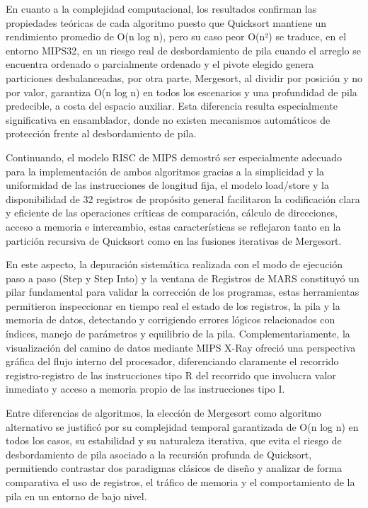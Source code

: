 \documentclass[12pt, letterpaper]{article}
\begin{document}
En cuanto a la complejidad computacional, los resultados confirman las propiedades teóricas de cada algoritmo puesto que Quicksort mantiene un rendimiento promedio de O(n log n), pero su caso peor O(n²) se traduce, en el entorno MIPS32, en un riesgo real de desbordamiento de pila cuando el arreglo se encuentra ordenado o parcialmente ordenado y el pivote elegido genera particiones desbalanceadas, por otra parte, Mergesort, al dividir por posición y no por valor, garantiza O(n log n) en todos los escenarios y una profundidad de pila predecible, a costa del espacio auxiliar. Esta diferencia resulta especialmente significativa en ensamblador, donde no existen mecanismos automáticos de protección frente al desbordamiento de pila.

Continuando, el modelo RISC de MIPS demostró ser especialmente adecuado para la implementación de ambos algoritmos gracias a la simplicidad y la uniformidad de las instrucciones de longitud fija, el modelo load/store y la disponibilidad de 32 registros de propósito general facilitaron la codificación clara y eficiente de las operaciones críticas de comparación, cálculo de direcciones, acceso a memoria e intercambio, estas características se reflejaron tanto en la partición recursiva de Quicksort como en las fusiones iterativas de Mergesort.

En este aspecto, la depuración sistemática realizada con el modo de ejecución paso a paso (Step y Step Into) y la ventana de Registros de MARS constituyó un pilar fundamental para validar la corrección de los programas, estas herramientas permitieron inspeccionar en tiempo real el estado de los registros, la pila y la memoria de datos, detectando y corrigiendo errores lógicos relacionados con índices, manejo de parámetros y equilibrio de la pila. Complementariamente, la visualización del camino de datos mediante MIPS X-Ray ofreció una perspectiva gráfica del flujo interno del procesador, diferenciando claramente el recorrido registro-registro de las instrucciones tipo R del recorrido que involucra valor inmediato y acceso a memoria propio de las instrucciones tipo I.

Entre diferencias de algoritmos, la elección de Mergesort como algoritmo alternativo se justificó por su complejidad temporal garantizada de O(n log n) en todos los casos, su estabilidad y su naturaleza iterativa, que evita el riesgo de desbordamiento de pila asociado a la recursión profunda de Quicksort, permitiendo contrastar dos paradigmas clásicos de diseño y analizar de forma comparativa el uso de registros, el tráfico de memoria y el comportamiento de la pila en un entorno de bajo nivel.
\end{document}
